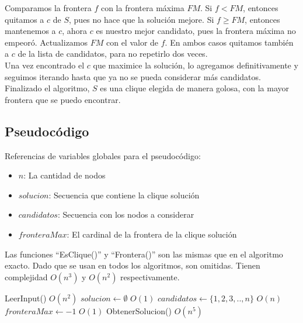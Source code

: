 Comparamos la frontera $f$ con la frontera máxima $FM$. Si $f < FM$, entonces quitamos a $c$ de $S$, pues no hace que la solución mejore. Si $f \geq FM$, entonces mantenemos a $c$, ahora $c$ es nuestro mejor candidato, pues la frontera máxima no empeoró. Actualizamos $FM$ con el valor de $f$. En ambos casos quitamos también a $c$ de la lista de candidatos, para no repetirlo dos veces. \\

Una vez encontrado el $c$ que maximice la solución, lo agregamos definitivamente y seguimos iterando hasta que ya no se pueda considerar más candidatos. \\

Finalizado el algoritmo, $S$ es una clique elegida de manera golosa, con la mayor frontera que se puedo encontrar. \\


\subsection{Pseudocódigo}

Referencias de variables globales para el pseudocódigo:
\begin{itemize}
    \item $n$: La cantidad de nodos
    \item $solucion$: Secuencia que contiene la clique solución
    \item $candidatos$: Secuencia con los nodos a considerar
    \item $fronteraMax$: El cardinal de la frontera de la clique solución
\end{itemize}

Las funciones ``EsClique()'' y ``Frontera()'' son las mismas que en el algoritmo exacto. Dado que se usan en todos los algoritmos, son omitidas. Tienen complejidad $O(n^3)$ y $O(n^2)$ respectivamente.

\begin{algorithm}[H]
\begin{algorithmic}
    \State LeerInput()                              \Comment $O(n^2)$
    \State $solucion \gets \emptyset$               \Comment $O(1)$
    \State $candidatos \gets \{1, 2, 3, .. , n\} $  \Comment $O(n)$
    \State $fronteraMax \gets -1$                   \Comment $O(1)$
    \State ObtenerSolucion()                        \Comment $O(n^5)$
\EndFunction
\end{algorithmic}
\end{algorithm}



